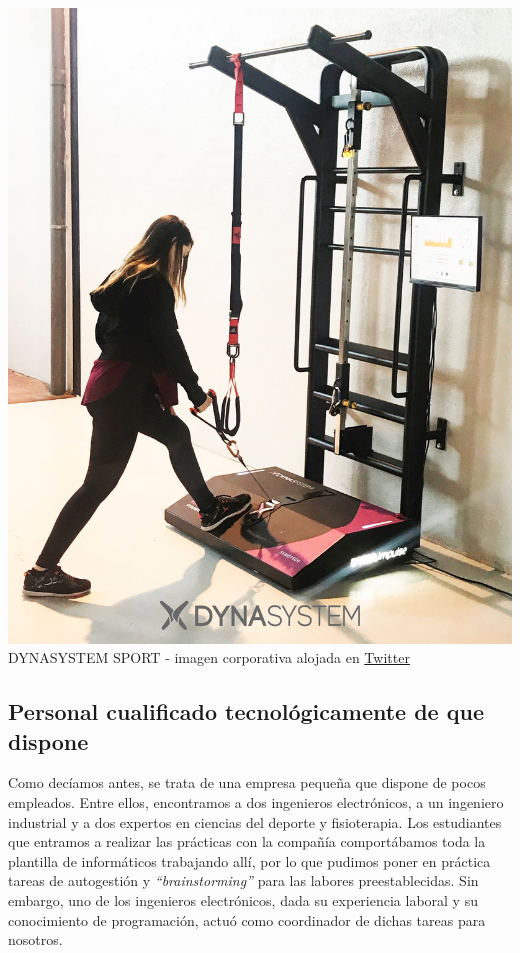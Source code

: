 \documentclass[13pt]{scrartcl}
\begin{document}
			\begin{center}
				\includegraphics[scale=0.16]{images/dynasystem-pink-station.jpeg}\\
				DYNASYSTEM SPORT - imagen corporativa alojada en \href{https://twitter.com/dynasystem_}{Twitter}
			\end{center}
		
		\subsection{Personal cualificado tecnológicamente de que dispone}
			Como decíamos antes, se trata de una empresa pequeña que dispone de pocos empleados. Entre ellos, encontramos a dos ingenieros electrónicos, a un ingeniero industrial y a dos expertos en ciencias del deporte y fisioterapia. Los estudiantes que entramos a realizar las prácticas con la compañía comportábamos toda la plantilla de informáticos trabajando allí, por lo que pudimos poner en práctica tareas de autogestión y \textit{``brainstorming''} para las labores preestablecidas. Sin embargo, uno de los ingenieros electrónicos, dada su experiencia laboral y su conocimiento de programación, actuó como coordinador de dichas tareas para nosotros.
		
\end{document}
